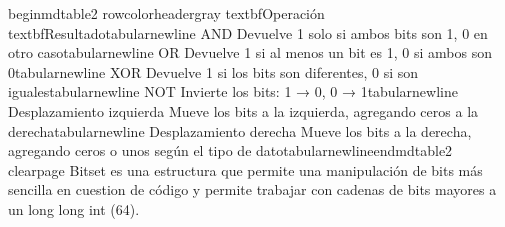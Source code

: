 \markdownRendererDocumentBegin
\markdownRendererSectionBegin
\markdownRendererSectionBegin
{}\markdownRendererInterblockSeparator
{}\markdownRendererSectionBegin
{}\markdownRendererInterblockSeparator
{}\markdownRendererBackslash{}begin\markdownRendererLeftBrace{}mdtable2\markdownRendererRightBrace{}\markdownRendererSoftLineBreak
{}\markdownRendererBackslash{}rowcolor\markdownRendererLeftBrace{}headergray\markdownRendererRightBrace{}\markdownRendererSoftLineBreak
{}\markdownRendererBackslash{}textbf\markdownRendererLeftBrace{}Operación\markdownRendererRightBrace{} \markdownRendererAmpersand{} \markdownRendererBackslash{}textbf\markdownRendererLeftBrace{}Resultado\markdownRendererRightBrace{}\markdownRendererBackslash{}tabularnewline\markdownRendererSoftLineBreak
{}AND \markdownRendererAmpersand{} Devuelve 1 solo si ambos bits son 1, 0 en otro caso\markdownRendererBackslash{}tabularnewline\markdownRendererSoftLineBreak
{}OR  \markdownRendererAmpersand{} Devuelve 1 si al menos un bit es 1, 0 si ambos son 0\markdownRendererBackslash{}tabularnewline\markdownRendererSoftLineBreak
{}XOR \markdownRendererAmpersand{} Devuelve 1 si los bits son diferentes, 0 si son iguales\markdownRendererBackslash{}tabularnewline\markdownRendererSoftLineBreak
{}NOT \markdownRendererAmpersand{} Invierte los bits: 1 → 0, 0 → 1\markdownRendererBackslash{}tabularnewline\markdownRendererSoftLineBreak
{}Desplazamiento izquierda \markdownRendererAmpersand{} Mueve los bits a la izquierda, agregando ceros a la derecha\markdownRendererBackslash{}tabularnewline\markdownRendererSoftLineBreak
{}Desplazamiento derecha \markdownRendererAmpersand{} Mueve los bits a la derecha, agregando ceros o unos según el tipo de dato\markdownRendererBackslash{}tabularnewline\markdownRendererBackslash{}end\markdownRendererLeftBrace{}mdtable2\markdownRendererRightBrace{}\markdownRendererInterblockSeparator
{}\markdownRendererInterblockSeparator
{}\markdownRendererDollarSign{}\markdownRendererBackslash{}clearpage\markdownRendererDollarSign{}\markdownRendererInterblockSeparator
{}
\markdownRendererSectionEnd 
\markdownRendererSectionEnd \markdownRendererSectionBegin
{}\markdownRendererInterblockSeparator
{}Bitset es una estructura que permite una manipulación de bits más sencilla en cuestion de código y permite trabajar con cadenas de bits mayores a un long long int (64).\markdownRendererInterblockSeparator
